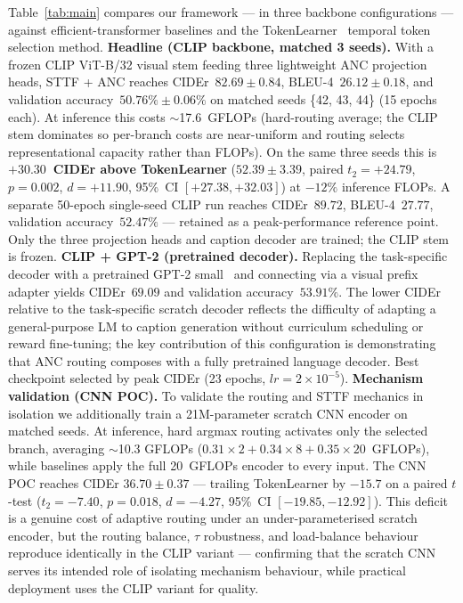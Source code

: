\documentclass{article}
\begin{document}
Table~\ref{tab:main} compares our framework --- in three backbone configurations --- against efficient-transformer baselines and the TokenLearner~\cite{ryoo2021tokenlearner} temporal token selection method.
\textbf{Headline (CLIP backbone, matched 3 seeds).} With a frozen CLIP ViT-B/32 visual stem feeding three lightweight ANC projection heads, STTF + ANC reaches CIDEr~$\mathbf{82.69 \pm 0.84}$, BLEU-4~$\mathbf{26.12 \pm 0.18}$, and validation accuracy~$\mathbf{50.76\% \pm 0.06\%}$ on matched seeds \{42, 43, 44\} (15 epochs each). At inference this costs $\sim$17.6~GFLOPs (hard-routing average; the CLIP stem dominates so per-branch costs are near-uniform and routing selects representational capacity rather than FLOPs). On the same three seeds this is \textbf{$+30.30$~CIDEr above TokenLearner} ($52.39 \pm 3.39$, paired $t_{2}{=}{+}24.79$, $p{=}0.002$, $d{=}{+}11.90$, 95\%~CI $[{+}27.38, {+}32.03]$) at $-12\%$ inference FLOPs. A separate 50-epoch single-seed CLIP run reaches CIDEr~$89.72$, BLEU-4~$27.77$, validation accuracy~$52.47\%$ --- retained as a peak-performance reference point. Only the three projection heads and caption decoder are trained; the CLIP stem is frozen.
\textbf{CLIP + GPT-2 (pretrained decoder).} Replacing the task-specific decoder with a pretrained GPT-2 small~\cite{radford2019gpt2} and connecting via a visual prefix adapter yields CIDEr~$69.09$ and validation accuracy~$53.91\%$. The lower CIDEr relative to the task-specific scratch decoder reflects the difficulty of adapting a general-purpose LM to caption generation without curriculum scheduling or reward fine-tuning; the key contribution of this configuration is demonstrating that ANC routing composes with a fully pretrained language decoder. Best checkpoint selected by peak CIDEr (23 epochs, $lr{=}2{\times}10^{-5}$).
\textbf{Mechanism validation (CNN POC).} To validate the routing and STTF mechanics in isolation we additionally train a 21M-parameter scratch CNN encoder on matched seeds. At inference, hard argmax routing activates only the selected branch, averaging $\sim$10.3 GFLOPs ($0.31{\times}2 + 0.34{\times}8 + 0.35{\times}20$~GFLOPs), while baselines apply the full 20~GFLOPs encoder to every input. The CNN POC reaches CIDEr $36.70 \pm 0.37$ --- trailing TokenLearner by $-15.7$ on a paired $t$-test ($t_{2}{=}{-}7.40$, $p{=}0.018$, $d{=}{-}4.27$, 95\%~CI $[-19.85, -12.92]$). This deficit is a genuine cost of adaptive routing under an under-parameterised scratch encoder, but the routing balance, $\tau$ robustness, and load-balance behaviour reproduce identically in the CLIP variant --- confirming that the scratch CNN serves its intended role of isolating mechanism behaviour, while practical deployment uses the CLIP variant for quality.
\end{document}
